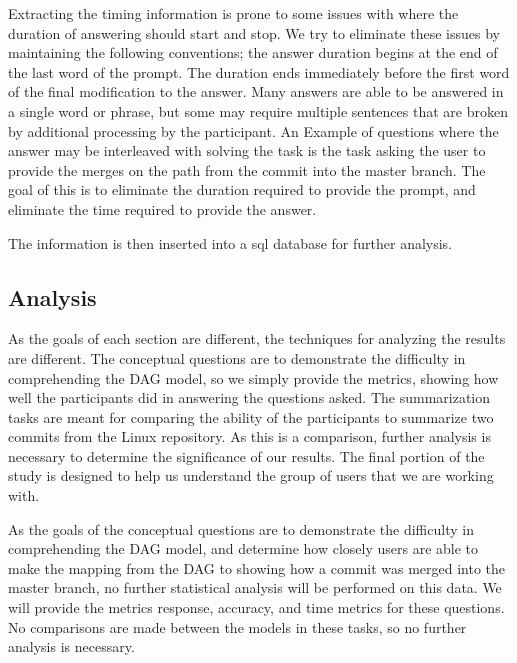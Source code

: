 Extracting the timing information is prone to some issues with where the
duration of answering should start and stop. We try to eliminate these
issues by maintaining the following conventions; the answer duration
begins at the end of the last word of the prompt. The duration ends
immediately before the first word of the final modification to the
answer. Many answers are able to be answered in a single word or phrase,
but some may require multiple sentences that are broken by additional
processing by the participant. An Example of questions where the answer
may be interleaved with solving the task is the task asking the user to
provide the merges on the path from the commit into the master branch.
The goal of this is to eliminate the duration required to provide the
prompt, and eliminate the time required to provide the answer.

The information is then inserted into a sql database for further
analysis.

\subsection{Analysis}

As the goals of each section are different, the techniques for analyzing
the results are different. The conceptual questions are to demonstrate
the difficulty in comprehending the DAG model, so we simply provide the
metrics, showing how well the participants did in answering the
questions asked. The summarization tasks are meant for comparing the
ability of the participants to summarize two commits from the Linux
repository. As this is a comparison, further analysis is necessary to
determine the significance of our results. The final portion of the
study is designed to help us understand the group of users that we are
working with.

As the goals of the conceptual questions are to demonstrate the
difficulty in comprehending the DAG model, and determine how closely
users are able to make the mapping from the DAG to showing how a commit
was merged into the master branch, no further statistical analysis will
be performed on this data. We will provide the metrics response,
accuracy, and time metrics for these questions. No comparisons are made
between the models in these tasks, so no further analysis is necessary.

